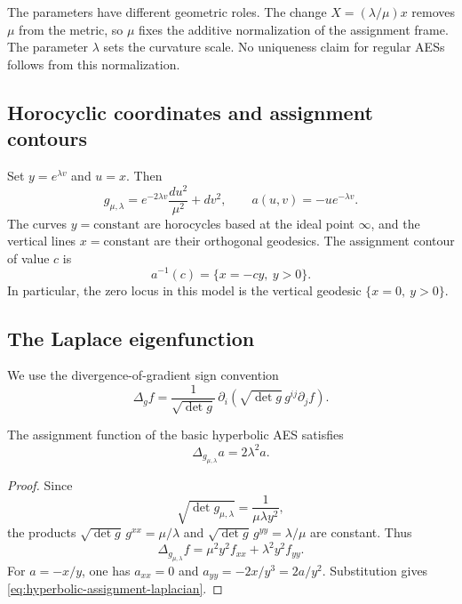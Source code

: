 The parameters have different geometric roles.  The change
\(X=(\lambda/\mu)x\) removes \(\mu\) from the metric, so \(\mu\) fixes the
additive normalization of the assignment frame.  The parameter \(\lambda\)
sets the curvature scale.  No uniqueness claim for regular AESs follows from
this normalization.

\subsection{Horocyclic coordinates and assignment contours}

Set \(y=e^{\lambda v}\) and \(u=x\).  Then
\begin{equation}\label{eq:horocyclic-affine-coordinates}
 g_{\mu,\lambda}
 =e^{-2\lambda v}\frac{du^2}{\mu^2}+dv^2,
 \qquad
 a(u,v)=-u e^{-\lambda v}.
\end{equation}
The curves \(y=\mathrm{constant}\) are horocycles based at the ideal point
\(\infty\), and the vertical lines \(x=\mathrm{constant}\) are their
orthogonal geodesics.  The assignment contour of value \(c\) is
\[
 a^{-1}(c)=\{x=-cy,\ y>0\}.
\]
In particular, the zero locus in this model is the vertical geodesic
\(\{x=0,\ y>0\}\).

\subsection{The Laplace eigenfunction}

We use the divergence-of-gradient sign convention
\begin{equation}\label{eq:laplacian-sign-convention}
 \Delta_g f
 =\frac1{\sqrt{\det g}}\,
  \partial_i\!\left(\sqrt{\det g}\,g^{ij}\partial_jf\right).
\end{equation}

\begin{proposition}\label{prop:laplace-eigenfunction}
The assignment function of the basic hyperbolic AES satisfies
\begin{equation}\label{eq:hyperbolic-assignment-laplacian}
 \Delta_{g_{\mu,\lambda}}a=2\lambda^2a.
\end{equation}
\end{proposition}

\begin{proof}
Since
\[
 \sqrt{\det g_{\mu,\lambda}}=\frac1{\mu\lambda y^2},
\]
the products
\(\sqrt{\det g}\,g^{xx}=\mu/\lambda\) and
\(\sqrt{\det g}\,g^{yy}=\lambda/\mu\) are constant.  Thus
\[
 \Delta_{g_{\mu,\lambda}}f
 =\mu^2y^2 f_{xx}+\lambda^2y^2 f_{yy}.
\]
For \(a=-x/y\), one has \(a_{xx}=0\) and
\(a_{yy}=-2x/y^3=2a/y^2\).  Substitution gives
\eqref{eq:hyperbolic-assignment-laplacian}.
\end{proof}

